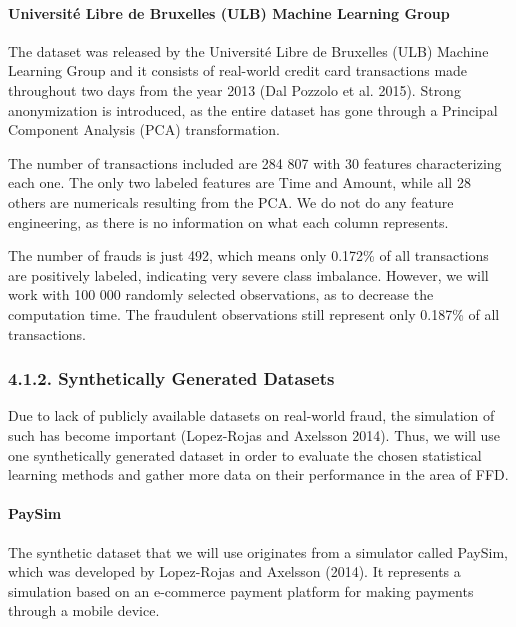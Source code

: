 \documentclass[12pt,]{article}
\let\oldparagraph\paragraph
\renewcommand{\paragraph}[1]{\oldparagraph{#1}\mbox{}}
\begin{document}
\hypertarget{universite-libre-de-bruxelles-ulb-machine-learning-group}{%
\paragraph{Université Libre de Bruxelles (ULB) Machine Learning
Group}\label{universite-libre-de-bruxelles-ulb-machine-learning-group}}

The dataset was released by the Université Libre de Bruxelles (ULB)
Machine Learning Group and it consists of real-world credit card
transactions made throughout two days from the year 2013 (Dal Pozzolo et
al. 2015). Strong anonymization is introduced, as the entire dataset has
gone through a Principal Component Analysis (PCA) transformation.

The number of transactions included are 284 807 with 30 features
characterizing each one. The only two labeled features are Time and
Amount, while all 28 others are numericals resulting from the PCA. We do
not do any feature engineering, as there is no information on what each
column represents.

The number of frauds is just 492, which means only 0.172\% of all
transactions are positively labeled, indicating very severe class
imbalance. However, we will work with 100 000 randomly selected
observations, as to decrease the computation time. The fraudulent
observations still represent only 0.187\% of all transactions.

\hypertarget{synthetically-generated-datasets}{%
\subsubsection{4.1.2. Synthetically Generated
Datasets}\label{synthetically-generated-datasets}}

Due to lack of publicly available datasets on real-world fraud, the
simulation of such has become important (Lopez-Rojas and Axelsson 2014).
Thus, we will use one synthetically generated dataset in order to
evaluate the chosen statistical learning methods and gather more data on
their performance in the area of FFD.

\hypertarget{paysim}{%
\paragraph{PaySim}\label{paysim}}

The synthetic dataset that we will use originates from a simulator
called PaySim, which was developed by Lopez-Rojas and Axelsson (2014).
It represents a simulation based on an e-commerce payment platform for
making payments through a mobile device.
\end{document}
